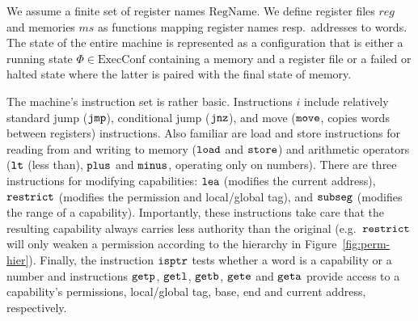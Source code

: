 \documentclass[format=acmsmall, review=true, screen=true]{acmart}
\renewcommand{\figurename}{Figure}
\newcommand\lau[1]{{\color{purple} \sf \footnotesize {LS: #1}}\\}
\renewcommand\lau[1]{}
\newcommand{\var}[1]{\mathit{#1}}
\newcommand{\hs}{\var{ms}}
\newcommand{\ms}{\hs}
\newcommand{\reg}{\var{reg}}
\newcommand{\plaindom}[1]{\mathrm{#1}}
\newcommand{\ExecConfs}{\plaindom{ExecConf}}
\newcommand{\RegName}{\plaindom{RegName}}
\newcommand{\zinstr}[1]{\mathtt{#1}}
\newcommand{\oneinstr}[2]{
  \ifthenelse{\equal{#2}{}}
  {\zinstr{#1}}
  {\zinstr{#1} \; #2}
}
\newcommand{\jmp}[1]{\oneinstr{jmp}{#1}}
\newcommand{\twoinstr}[3]{
  \ifthenelse{\equal{#2#3}{}}
  {\zinstr{#1}}
  {\zinstr{#1} \; #2 \; #3}
}
\newcommand{\restricttwo}[2]{\twoinstr{restrict}{#1}{#2}}
\newcommand{\jnz}[2]{\twoinstr{jnz}{#1}{#2}}
\newcommand{\isptr}[2]{\twoinstr{isptr}{#1}{#2}}
\newcommand{\geta}[2]{\twoinstr{geta}{#1}{#2}}
\newcommand{\getb}[2]{\twoinstr{getb}{#1}{#2}}
\newcommand{\gete}[2]{\twoinstr{gete}{#1}{#2}}
\newcommand{\getp}[2]{\twoinstr{getp}{#1}{#2}}
\newcommand{\getl}[2]{\twoinstr{getl}{#1}{#2}}
\newcommand{\move}[2]{\twoinstr{move}{#1}{#2}}
\newcommand{\store}[2]{\twoinstr{store}{#1}{#2}}
\newcommand{\load}[2]{\twoinstr{load}{#1}{#2}}
\newcommand{\lea}[2]{\twoinstr{lea}{#1}{#2}}
\newcommand{\threeinstr}[4]{
  \ifthenelse{\equal{#2#3#4}{}}
  {\zinstr{#1}}
  {\zinstr{#1} \; #2 \; #3 \; #4}
}
\newcommand{\subseg}[3]{\threeinstr{subseg}{#1}{#2}{#3}}
\newcommand{\plus}[3]{\threeinstr{plus}{#1}{#2}{#3}}
\newcommand{\minus}[3]{\threeinstr{minus}{#1}{#2}{#3}}
\newcommand{\lt}[3]{\threeinstr{lt}{#1}{#2}{#3}}
\begin{document}
We assume a finite set of register names $\RegName$.
We define register files $\reg$ and memories $\ms$ as functions mapping register names resp.\ addresses to words.
The state of the entire machine is represented as a configuration that is either a running state $\Phi \in \ExecConfs$ containing a memory and a register file or a failed or halted state where the latter is paired with the final state of memory.



The machine's instruction set is rather basic.
Instructions $i$ include relatively standard jump ($\jmp{}$), conditional jump ($\jnz{}{}$), and move ($\move{}{}$, copies words between registers) instructions.
Also familiar are load and store instructions for reading from and writing to memory ($\load{}{}$ and $\store{}{}$) and arithmetic operators ($\lt{}{}{}$ (less than), $\plus{}{}{}$ and $\minus{}{}{}$, operating only on numbers).
There are three instructions for modifying capabilities: $\lea{}{}$ (modifies the current address), $\restricttwo{}{}$ (modifies the permission and local/global tag), and $\subseg{}{}{}$ (modifies the range of a capability).
Importantly, these instructions take care that the resulting capability always carries less authority than the original (e.g.\ $\restricttwo{}{}$ will only weaken a permission according to the hierarchy in \figurename~\ref{fig:perm-hier}).
Finally, the instruction $\isptr{}{}$ tests whether a word is a capability or a number and instructions $\getp{}{}$, $\getl{}{}$, $\getb{}{}$, $\gete{}{}$ and $\geta{}{}$ provide access to a capability's permissions, local/global tag, base, end and current address, respectively.
\end{document}
